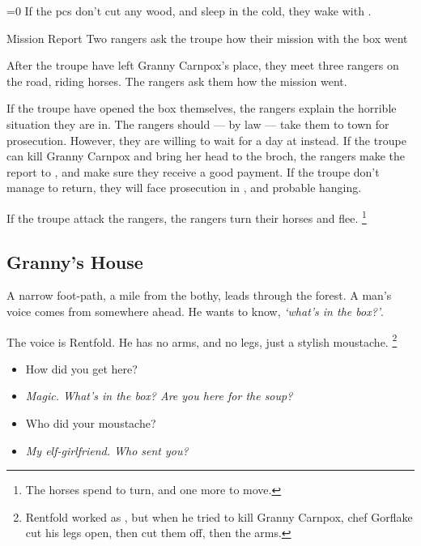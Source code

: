 \documentclass[10pt,twoside]{book}
\begin{document}
\ifnum\value{temperature}=0
  If the \glspl{pc} don't cut any wood, and sleep in the cold, they wake with .
\fi

{Mission Report}%
{Two \glspl{ranger} ask the troupe how their mission with the box went}%

After the troupe have left Granny Carnpox's place, they meet three \glspl{ranger} on the road, riding horses.
The rangers ask them how the mission went.

\humansoldier[\npc{\T[3]\Hu\M\F}{\composeHumanName, \composeHumanName, \& \composeHumanName}]


If the troupe have opened the box themselves, the \glspl{ranger} explain the horrible situation they are in.
The \glspl{ranger} should --- by law --- take them to town for prosecution.
However, they are willing to wait for a day at  instead.
If the troupe can kill Granny Carnpox and bring her head to the \gls{broch}, the \glspl{ranger} make the report to , and make sure they receive a good payment.
If the troupe don't manage to return, they will face prosecution in , and probable hanging.

If the troupe attack the \glspl{ranger}, the \glspl{ranger} turn their horses and flee.%
\footnote{The horses spend  to turn, and one more to move.}

\subsection{Granny's House}

\begin{boxtext}
  A narrow foot-path, a mile from the \gls{bothy}, leads through the forest.
  A man's voice comes from somewhere ahead.
  He wants to know, \textit{`what's in the box?'}.
\end{boxtext}

The voice is Rentfold.
He has no arms, and no legs, just a stylish moustache.%
\footnote{Rentfold worked as , but when he tried to kill Granny Carnpox, chef Gorflake cut his legs open, then cut them off, then the arms.}

\begin{itemize}
  \item\sf
  How did you get here?
  \item\it
  Magic.
  What's in the box?
  Are you here for the soup?
  \item\sf
  Who did your moustache?
  \item\it
  My elf-girlfriend.
  Who sent you?
\end{itemize}
\end{document}
